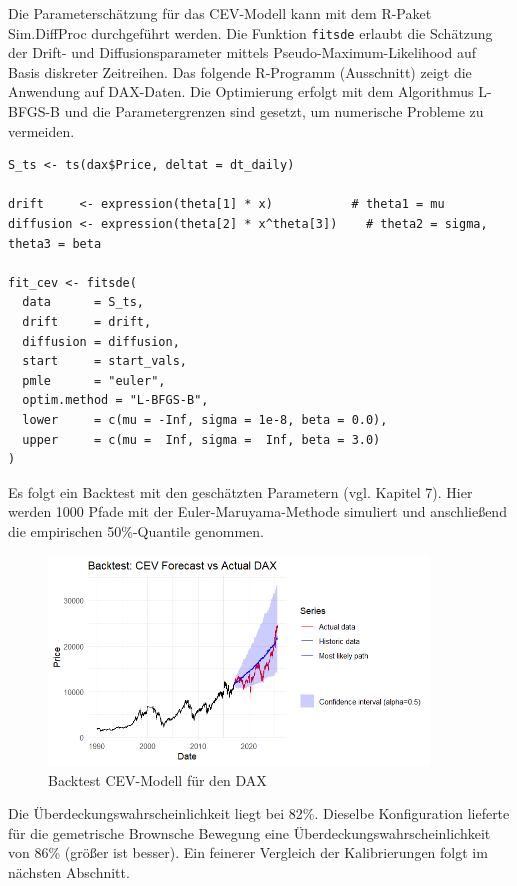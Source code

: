 \begin{bsp}
Die Parameterschätzung für das CEV-Modell kann mit dem R-Paket Sim.DiffProc durchgeführt werden. Die 
Funktion \texttt{fitsde} erlaubt die Schätzung der Drift- und Diffusionsparameter mittels 
Pseudo-Maximum-Likelihood auf Basis diskreter Zeitreihen. Das folgende R-Programm (Ausschnitt) zeigt die Anwendung auf DAX-Daten.
Die Optimierung erfolgt mit dem Algorithmus L-BFGS-B und die Parametergrenzen sind gesetzt, um numerische Probleme zu vermeiden.

\begin{lstlisting}
S_ts <- ts(dax$Price, deltat = dt_daily)

drift     <- expression(theta[1] * x)           # theta1 = mu
diffusion <- expression(theta[2] * x^theta[3])    # theta2 = sigma, theta3 = beta

fit_cev <- fitsde(
  data      = S_ts,
  drift     = drift,
  diffusion = diffusion,
  start     = start_vals,
  pmle      = "euler",
  optim.method = "L-BFGS-B",
  lower     = c(mu = -Inf, sigma = 1e-8, beta = 0.0),
  upper     = c(mu =  Inf, sigma =  Inf, beta = 3.0)
)
\end{lstlisting}

Es folgt ein Backtest mit den geschätzten Parametern (vgl. Kapitel 7). Hier werden 1000 Pfade mit der
Euler-Maruyama-Methode simuliert und anschließend die empirischen 50\%-Quantile genommen.

\begin{figure}[H]
    \centering
    \includegraphics[width=0.9\textwidth]{images/cev_dax_backtest.png}
    \caption{Backtest CEV-Modell für den DAX}
    \label{fig:cev_dax_backtest}
\end{figure}

Die Überdeckungswahrscheinlichkeit liegt bei 82\%. Dieselbe Konfiguration
lieferte für die gemetrische Brownsche Bewegung eine Überdeckungswahrscheinlichkeit von 86\% (größer ist besser).
Ein feinerer Vergleich der Kalibrierungen folgt im nächsten Abschnitt. 

\end{bsp}

